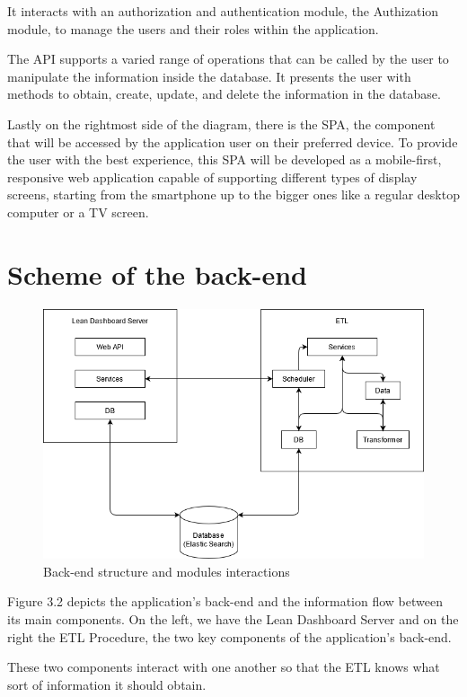 \documentclass[a4paper,twoside,10pt]{report}
\begin{document}
It interacts with an authorization and authentication module, the Authization module, to manage the users and their roles within the application.

The API supports a varied range of operations that can be called by the user to manipulate the information inside the database. It presents the user with methods to obtain, create, update, and delete the information in the database.

Lastly on the rightmost side of the diagram, there is the SPA, the component that will be accessed by the application user on their preferred device. To provide the user with the best experience, this SPA will be developed as a mobile-first, responsive web application capable of supporting different types of display screens, starting from the smartphone up to the bigger ones like a regular desktop computer or a TV screen.
\newpage
\section{Scheme of the back-end}
\begin{figure}[h!]
\center
    \includegraphics[width=\textwidth]{arquitetura software.png}
    \caption{Back-end structure and modules interactions}
\end{figure}
Figure 3.2 depicts the application's back-end and the information flow between its main components. On the left, we have the Lean Dashboard Server and on the right the ETL Procedure, the two key components of the application's back-end.

These two components interact with one another so that the ETL knows what sort of information it should obtain.
\end{document}
